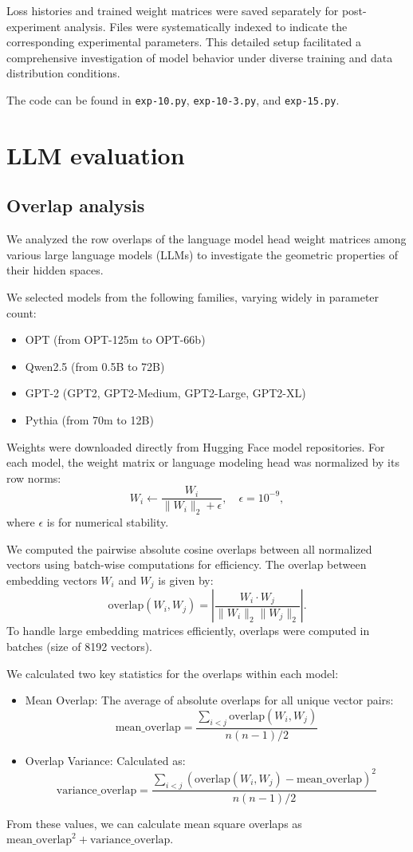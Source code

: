 \documentclass{article}
\begin{document}
Loss histories and trained weight matrices were saved separately for post-experiment analysis. Files were systematically indexed to indicate the corresponding experimental parameters. This detailed setup facilitated a comprehensive investigation of model behavior under diverse training and data distribution conditions.

The code can be found in \texttt{exp-10.py}, \texttt{exp-10-3.py}, and \texttt{exp-15.py}.

\section{LLM evaluation}\label{app:LLMs}

\subsection{Overlap analysis}\label{app:LLMover}
We analyzed the row overlaps of the language model head weight matrices among various large language models (LLMs) to investigate the geometric properties of their hidden spaces.

We selected models from the following families, varying widely in parameter count:
\begin{itemize}
    \item OPT (from OPT-125m to OPT-66b)
    \item Qwen2.5 (from 0.5B to 72B)
    \item GPT-2 (GPT2, GPT2-Medium, GPT2-Large, GPT2-XL)
    \item Pythia (from 70m to 12B)
\end{itemize}


Weights were downloaded directly from Hugging Face model repositories. For each model, the weight matrix or language modeling head was normalized by its row norms:
\[
W_i \leftarrow \frac{W_i}{\|W_i\|_2 + \epsilon}, \quad \epsilon = 10^{-9},
\]
where $\epsilon$ is for numerical stability.

We computed the pairwise absolute cosine overlaps between all normalized vectors using batch-wise computations for efficiency. The overlap between embedding vectors \(W_i\) and \(W_j\) is given by:
\[
\text{overlap}(W_i, W_j) = \left|\frac{W_i \cdot W_j}{\|W_i\|_2 \|W_j\|_2}\right|.
\]
To handle large embedding matrices efficiently, overlaps were computed in batches (size of 8192 vectors).

We calculated two key statistics for the overlaps within each model:
\begin{itemize}
    \item Mean Overlap: The average of absolute overlaps for all unique vector pairs:
    \[
    \text{mean\_overlap} = \frac{\sum_{i<j} \text{overlap}(W_i, W_j)}{n(n-1)/2}
    \]
    \item Overlap Variance: Calculated as:
    \[
    \text{variance\_overlap} = \frac{\sum_{i<j} (\text{overlap}(W_i, W_j) - \text{mean\_overlap})^2}{n(n-1)/2}
    \]
\end{itemize}
From these values, we can calculate mean square overlaps as $\text{mean\_overlap}^2 + \text{variance\_overlap}$.
\end{document}
